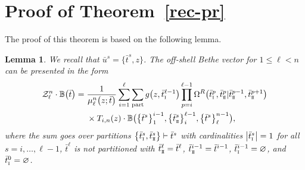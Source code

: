 \documentclass[10pt,a4paper]{amsart}
\newcommand{\so}{\scriptscriptstyle \rm I}
\newcommand{\st}{\scriptscriptstyle \rm I\hspace{-1pt}I}
\newcommand{\bu}{\bar u}
\newcommand{\bt}{{\bar t}}
\newtheorem{lem}[thm]{Lemma}
\theoremstyle{definition}
\def\BB{{\mathbb{B}}}
\def\Z{\mathcal{Z}}
\def\Omr{\Omega^R}
\begin{document}
\appendix

\section[Proof of the Theorem 3.1]{Proof of Theorem~\ref{rec-pr}}\label{ApA}

The proof of this theorem is based on the following lemma.
\begin{lem}\label{l-pr}
We recall that $\bar u^s=\bigl\{\bar t^s,z\bigr\}$.
The off-shell Bethe vector
\smash{$\BB\bigl(\bigl\{\bt^s\bigr\}_1^{\ell-1},\bigl\{\bu^s\bigr\}_\ell^{n-1}\bigr)$} for $1\leq \ell< n$
can be presented in the form
\begin{align}
\Z_{\ell}^n\cdot \BB\bigl(\bt\bigr)={}&
\frac{1}{\mu_\ell^n\bigl(z;\bt\bigr)}
\sum_{i=1}^\ell \sum_{\rm part} g\bigl(z,\bt^{\ell-1}_{\so}\bigr)
\prod_{p=i}^{\ell-1}\Omr\bigl(\bt^p_{\so},\bt^p_{\st}|\bt^{p-1}_{\st},\bt^{p+1}_{\st}\bigr)\nonumber
\\
&\times T_{i,n}(z)\cdot\BB\bigl(\bigl\{\bt^s\bigr\}_1^{i-1},\bigl\{\bt^s_{\st}\bigr\}_i^{\ell-1},
\bigl\{\bt^s\bigr\}_\ell^{n-1}\bigr) ,\label{Az8}
\end{align}
where the sum goes over partitions $\bigl\{\bt^s_{\so},\bt^s_{\st}\bigr\}\vdash\bt^s$
with cardinalities $\big|\bt^s_{\so}\big|=1$ for all $s=i,\dots,\ell-1$, $\bt^\ell$ is not
 partitioned with $\bt^\ell_{\st}=\bt^\ell$, $\bt^{i-1}_{\st} = \bt^{i-1}$, $\bt^{i-1}_{\so} = \varnothing$, and $\bt^0_{\so} = \varnothing$.
\end{lem}
\end{document}
